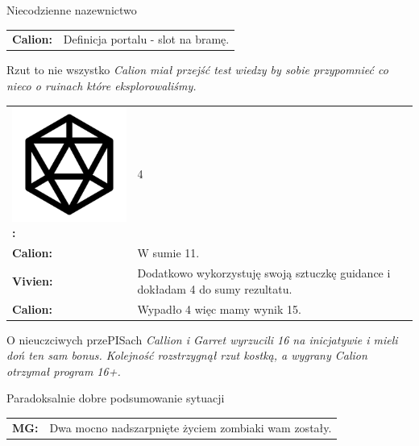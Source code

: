 \documentclass[10pt,twoside,twocolumn]{book}
\begin{document}
\begin{rpg-quotebox}{Niecodzienne nazewnictwo}
   \begin{tabularx}{\columnwidth}{lX}
      \textbf{Calion:} & Definicja portalu - slot na bramę.\\
   \end{tabularx}
\end{rpg-quotebox}


\begin{rpg-quotebox}{Rzut to nie wszystko}
   \textit{Calion miał przejść test wiedzy by sobie przypomnieć co nieco o ruinach które eksplorowaliśmy.}\\

   \begin{tabularx}{\columnwidth}{lX}
      \includegraphics[scale=0.06]{img/d20.png}\textbf{:}& 4\\
      \textbf{Calion:} & W sumie 11.\\
      \textbf{Vivien:} & Dodatkowo wykorzystuję swoją sztuczkę guidance i dokładam 4 do sumy rezultatu.\\
      \textbf{Calion:} & Wypadło 4 więc mamy wynik 15.\\
   \end{tabularx}
\end{rpg-quotebox}


\begin{rpg-quotebox}{O nieuczciwych przePISach}
   \textit{Callion i Garret wyrzucili 16 na inicjatywie i mieli doń ten sam bonus. Kolejność rozstrzygnął rzut kostką, a wygrany Calion otrzymał program 16+.}
\end{rpg-quotebox}


\begin{rpg-quotebox}{Paradoksalnie dobre podsumowanie sytuacji}
   \begin{tabularx}{\columnwidth}{lX}
      \textbf{MG:} & Dwa mocno nadszarpnięte życiem zombiaki wam zostały.\\
   \end{tabularx}
\end{rpg-quotebox}
\end{document}

